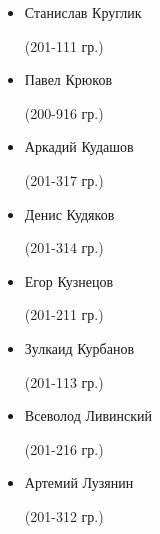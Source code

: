 \begin{multicols}{2}
\begin{small}
\begin{itemize}[leftmargin=*]
	\item[] Станислав Круглик\begin{tiny} (201-111 гр.)\end{tiny}
	\item[] Павел Крюков\begin{tiny} (200-916 гр.)\end{tiny} %
	\item[] Аркадий Кудашов\begin{tiny} (201-317 гр.)\end{tiny} %
	\item[] Денис Кудяков\begin{tiny} (201-314 гр.)\end{tiny} %
	\item[] Егор Кузнецов\begin{tiny} (201-211 гр.)\end{tiny}
	\item[] Зулкаид Курбанов\begin{tiny} (201-113 гр.)\end{tiny}

	\item[] Всеволод Ливинский\begin{tiny} (201-216 гр.)\end{tiny} %
	\item[] Артемий Лузянин\begin{tiny} (201-312 гр.)\end{tiny} %


\end{itemize}
\end{small}
\end{multicols}
